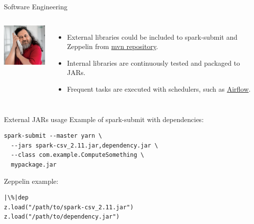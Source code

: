 \documentclass[unicode, notheorems]{beamer}
\begin{document}
\begin{frame}{Software Engineering}

\begin{columns}
\begin{center}
	\includegraphics[width=3.2cm]{images/software-developer}
\end{center}

\begin{itemize}
\item External libraries could be included to spark-submit and Zeppelin from \href{http://mvnrepository.com/}{mvn repository}. \pause
\item Internal libraries are continuously tested and packaged to JARs. \pause
\item Frequent tasks are executed with schedulers, such as \href{https://pythonhosted.org/airflow/}{Airflow}.
\end{itemize}
\end{columns}
\end{frame}


\begin{frame}[fragile]{External JARs usage}
Example of spark-submit with dependencies:

\begin{verbatim}
spark-submit --master yarn \
  --jars spark-csv_2.11.jar,dependency.jar \
  --class com.example.ComputeSomething \
  mypackage.jar
\end{verbatim}

\vfill
Zeppelin example:

\begin{verbatim}
|\%|dep
z.load("/path/to/spark-csv_2.11.jar")
z.load("/path/to/dependency.jar")
\end{verbatim}
\end{frame}
\end{document}
